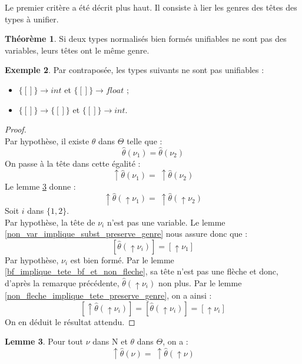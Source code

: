 \documentclass[a4paper]{report}
\newenvironment{preuve} 
	{\begin{proof}~\\} 
	{\end{proof}}
\theoremstyle{definition}
\newtheorem{theoreme}{Théorème}
\newtheorem{lemme}[theoreme]{Lemme}
\newtheorem{exemple}[theoreme]{Exemple}
\newcommand{\mset}[1]{\{\![#1]\!\}}
\newcommand{\N}{\mathrm{N}}
\begin{document}
Le premier critère a été décrit plus haut. Il consiste à lier les genres des têtes des types à unifier.

\begin{theoreme} \label{thm_cond1}
	Si deux types normalisés bien formés unifiables ne sont pas des variables, leurs têtes ont le même genre.
\end{theoreme}

\begin{exemple}
	Par contraposée, les types suivants ne sont pas unifiables :
	\begin{itemize}
		\item $\mset{} \rightarrow int$ et $\mset{} \rightarrow float$ ;
		\item $\mset{} \rightarrow \mset{}$ et $\mset{} \rightarrow int$.
	\end{itemize}
\end{exemple}

\begin{preuve}
	Par hypothèse, il existe $\theta$ dans $\Theta$ telle que :
	\[ \hat\theta (\nu_1) = \hat\theta (\nu_2) \]
	On passe à la tête dans cette égalité :
	\[ \uparrow \hat\theta (\nu_1) =\ \uparrow \hat\theta (\nu_2) \]
	Le lemme \ref{tete_subst_eq_tete_subst_tete} donne :
	\[ \uparrow \hat\theta (\uparrow \nu_1) =\ \uparrow \hat\theta (\uparrow \nu_2) \]
	Soit $i$ dans $\{ 1, 2 \}$. \\
	Par hypothèse, la tête de $\nu_i$ n'est pas une variable. Le lemme \ref{non_var_implique_subst_preserve_genre} nous assure donc que :
	\[ [ \hat\theta (\uparrow \nu_i) ] = [ \uparrow \nu_1 ] \]
	Par hypothèse, $\nu_i$ est bien formé. Par le lemme \ref{bf_implique_tete_bf_et_non_fleche}, sa tête n'est pas une flèche et donc, d'après la remarque précédente, $\hat\theta (\uparrow \nu_i)$ non plus. Par le lemme \ref{non_fleche_implique_tete_preserve_genre}, on a ainsi :
	\[ [ \uparrow \hat\theta (\uparrow \nu_i) ] = [ \hat\theta (\uparrow \nu_i) ] = [ \uparrow \nu_i ] \]
	On en déduit le résultat attendu.
\end{preuve}

\begin{lemme} \label{tete_subst_eq_tete_subst_tete}
	Pour tout $\nu$ dans $\N$ et $\theta$ dans $\Theta$, on a :
	\[ \uparrow \hat\theta (\nu) =\ \uparrow \hat\theta (\uparrow \nu) \]
\end{lemme}
\end{document}
